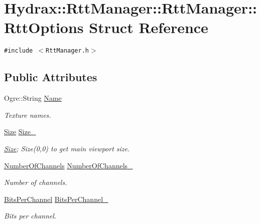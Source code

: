 \hypertarget{struct_hydrax_1_1_rtt_manager_1_1_rtt_options}{
\section{Hydrax::RttManager::RttManager::RttOptions Struct Reference}
\label{struct_hydrax_1_1_rtt_manager_1_1_rtt_options}
}
{\tt \#include $<$RttManager.h$>$}

\subsection*{Public Attributes}
\begin{CompactItemize}
\item 
Ogre::String \hyperlink{struct_hydrax_1_1_rtt_manager_1_1_rtt_options_cd14075f58ea5d9b4552642dca6537f9}{Name}
\begin{CompactList}\small\item\em Texture names. \item\end{CompactList}\item 
\hyperlink{struct_hydrax_1_1_size}{Size} \hyperlink{struct_hydrax_1_1_rtt_manager_1_1_rtt_options_bfc4ca83d30b2cb28bc476d9b0c8aa2c}{Size\_\-}
\begin{CompactList}\small\item\em \hyperlink{struct_hydrax_1_1_size}{Size}; Size(0,0) to get main viewport size. \item\end{CompactList}\item 
\hyperlink{class_hydrax_1_1_rtt_manager_8f74f31025f23f6ed8930a0d79a70731}{NumberOfChannels} \hyperlink{struct_hydrax_1_1_rtt_manager_1_1_rtt_options_cd5c7e81620666f51aa69d319f3f1790}{NumberOfChannels\_\-}
\begin{CompactList}\small\item\em Number of channels. \item\end{CompactList}\item 
\hyperlink{class_hydrax_1_1_rtt_manager_ab09efbd8ec25f88656a27d6a4f0446e}{BitsPerChannel} \hyperlink{struct_hydrax_1_1_rtt_manager_1_1_rtt_options_21073bf01e408cfbd5ee143195f34486}{BitsPerChannel\_\-}
\begin{CompactList}\small\item\em Bits per channel. \item\end{CompactList}\end{CompactItemize}


